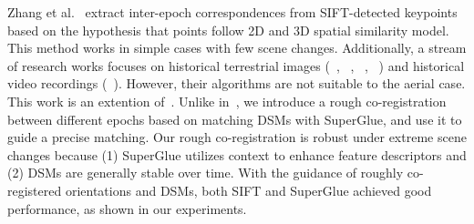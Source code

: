 Zhang et al.~\cite{zhang2020guided} extract inter-epoch correspondences from SIFT-detected keypoints based on the hypothesis that points follow 2D and 3D spatial similarity model. This method works in simple cases with few scene changes.
{Additionally, a stream of research works focuses on historical terrestrial images (~\cite{maiwald2021automatic}, ~\cite{beltrami20193d}, ~\cite{bevilacqua2019reconstruction}, ~\cite{maiwald2019generation}) and historical video recordings (~\cite{maiwald2019generation}). However, their algorithms are not suitable to the aerial case.}\\
This work is an extention of~\cite{zhang2020guided}. Unlike in~\cite{zhang2020guided}, we introduce a rough co-registration between different epochs based on matching DSMs with SuperGlue, and use it to guide a precise matching. Our rough co-registration is robust under extreme scene changes because (1) SuperGlue utilizes context to enhance feature descriptors and (2) DSMs are generally stable over time. With the guidance of roughly co-registered orientations and DSMs, both SIFT and SuperGlue achieved good performance, as shown in our experiments.
